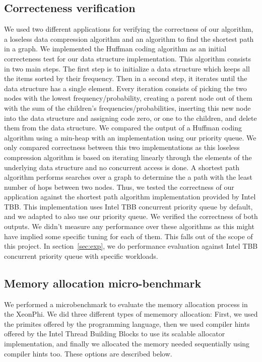 \subsection{Correcteness verification}
\label{subsec:corr_ver}
We used two different applications for verifying the correctness of our algorithm, a loseless data compression algorithm and an algorithm to find the shortest path in a graph. 
We implemented the Huffman coding algorithm as an initial correcteness test for our data structure implementation. This algorithm consists in two main steps. The first step is to initialize a data structure which keeps all the items sorted by their frequency. Then in a second step, it iterates until the data structure has a single element. Every iteration consists of picking the two nodes with the lowest frequency/probability, creating a parent node out of them with the sum of the children's frequencies/probabilities, inserting this new node into the data structure and assigning code zero, or one to the children, and delete them from the data structure. We compared the output of a Huffman coding algorithm using a min-heap with an implementation using our priority queue. We only compared correctness between this two implementations as this loseless compression algorithm is based on iterating linearly through the elements of the underlying data structure and no concurrent access is done.
A shortest path algorithm performs searches over a graph to determine the a path with the least number of hops between two nodes. Thus, we tested the correctness of our application against the shortest path algorithm implementation provided by Intel TBB. This implementation uses Intel TBB concurrent priority queue by default, and we adapted to also use our priority queue. We verified the correctness of both outputs. We didn't measure any performance over these algorithms as this might have implied some specific tuning for each of them. This falls out of the scope of this project. In section~\ref{sec:exp}, we do performance evaluation against Intel TBB concurrent priority queue with specific workloads.

\subsection{Memory allocation micro-benchmark}
We performed a microbenchmark to evaluate the memory allocation process in the XeonPhi. We did three different types of mememory allocation: First, we used the primites offered by the programming language, then we used compiler hints offered by the Intel Thread Building Blocks to use its scalable allocator implementation, and finally we allocated the memory needed sequentially using compiler hints too. These options are described below.

